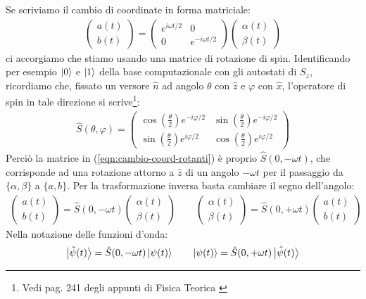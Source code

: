 \documentclass[../../InformazioneQuantistica.tex]{subfiles}
\begin{document}
\begin{enumerate}
Se scriviamo il cambio di coordinate in forma matriciale:
\begin{align}
\begin{pmatrix}a(t) \\ b(t)\end{pmatrix} = \begin{pmatrix} e^{i\omega t/2} & 0 \\ 0 & e^{-i\omega t/2}\end{pmatrix}
\begin{pmatrix}
\alpha(t)\\\beta(t)
\end{pmatrix}
\label{eqn:cambio-coord-rotanti}
\end{align}
ci accorgiamo che stiamo usando una matrice di rotazione di spin. Identificando per esempio $\Ket{0}$ e $\Ket{1}$ della base computazionale con gli autostati di $S_z$, ricordiamo che, fissato un versore $\hat{n}$ ad angolo $\theta$ con $\hat{z}$ e $\varphi$ con $\hat{x}$, l'operatore di spin in tale direzione si scrive\footnote{Vedi pag. 241 degli appunti di Fisica Teorica \cite{note-MQ}}:
\begin{align*}
\hat{S}(\theta,\varphi) = \begin{pmatrix}
 \cos\left(\frac{\theta}{2}\right)e^{-i\varphi/2} & \sin\left(\frac{\theta}{2}\right) e^{-i\varphi/2}\\
\sin\left(\frac{\theta}{2}\right) e^{i\varphi/2} & \cos\left(\frac{\theta}{2}\right) e^{i\varphi/2}
\end{pmatrix}
\end{align*} 
Perciò la matrice in (\ref{eqn:cambio-coord-rotanti}) è proprio $\hat{S}(0,-\omega t)$, 
che corrisponde ad una rotazione attorno a $\hat{z}$ di un angolo $-\omega t$ per il passaggio da $\{\alpha, \beta\}$ a $\{a,b\}$. Per la trasformazione inversa basta cambiare il segno dell'angolo:
\begin{align*}
\begin{pmatrix}a(t)\\ b(t)\end{pmatrix}= \hat{S}(0,-\omega t ) \begin{pmatrix}\alpha(t)\\\beta(t)\end{pmatrix} \qquad \begin{pmatrix} \alpha(t) \\ \beta(t)\end{pmatrix} = \hat{S}(0,+\omega t) \begin{pmatrix}a(t) \\ b(t) \end{pmatrix}
\end{align*}
Nella notazione delle funzioni d'onda:
\begin{align*}
\Ket{\tilde{\psi}(t)} = \hat{S}(0,-\omega t) \Ket{\psi(t)} \qquad \Ket{\psi(t)}=\hat{S}(0,+\omega t) \Ket{\tilde{\psi}(t)}
\end{align*}


\end{enumerate}
\end{document}
